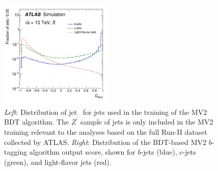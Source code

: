 \begin{figure}[!htb]
    \begin{center}
        \includegraphics[width=0.48\textwidth]{figures/chapter3/ftag/ftag_mv2c10_disc}
        \caption{
            \textit{Left}: Distribution of jet \pT~for jets used in the training of the MV2 BDT algorithm.
                The $Z^{\prime}$ sample of jets is only included in the MV2 training relevant to the analyses
                based on the full Run-II dataset collected by ATLAS.
            \textit{Right}: Distribution of the BDT-based MV2 $b$-tagging algorithm output score, shown for
                $b$-jets (blue), $c$-jets (green), and light-flavor jets (red).
        }
        \label{fig:ftag_mv2c10_disc}
    \end{center}
\end{figure}



